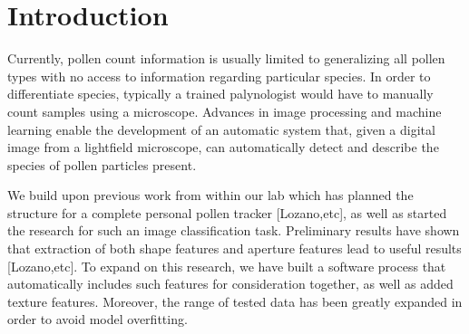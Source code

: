 \section{Introduction}

Currently, pollen count information is usually limited to generalizing all pollen types with no access to information regarding particular species. In order to differentiate species, typically a trained palynologist would have to manually count samples using a microscope. Advances in image processing and machine learning enable the development of an automatic system that, given a digital image from a lightfield microscope, can automatically detect and describe the species of pollen particles present.

We build upon previous work from within our lab which has planned the structure for a complete personal pollen tracker [Lozano,etc], as well as started the research for such an image classification task. Preliminary results have shown that extraction of both shape features and aperture features lead to useful results [Lozano,etc]. To expand on this research, we have built a software process that automatically includes such features for consideration together, as well as added texture features. Moreover, the range of tested data has been greatly expanded in order to avoid model overfitting. 
